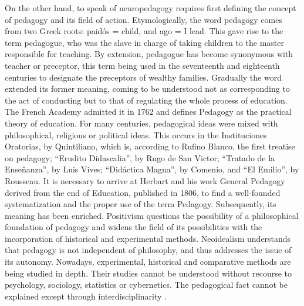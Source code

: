 \documentclass[english]{textolivre}
\begin{document}
On the other hand, to speak of neuropedagogy requires first defining the concept of pedagogy and its field of action. Etymologically, the word pedagogy comes from two Greek roots: paidós = child, and ago = I lead. This gave rise to the term pedagogue, who was the slave in charge of taking children to the master responsible for teaching. By extension, pedagogue has become synonymous with teacher or preceptor, this term being used in the seventeenth and eighteenth centuries to designate the preceptors of wealthy families. Gradually the word extended its former meaning, coming to be understood not as corresponding to the act of conducting but to that of regulating the whole process of education. The French Academy admitted it in 1762 and \textcite{durkheim_jugements_1911} defines Pedagogy as the practical theory of education. For many centuries, pedagogical ideas were mixed with philosophical, religious or political ideas. This occurs in the Instituciones Oratorias, by Quintiliano, which is, according to Rufino Blanco, the first treatise on pedagogy; “Erudito Didascalia”, by Rugo de San Victor; “Tratado de la Enseñanza”, by Luis Vives; “Didáctica Magna”, by Comenio, and “El Emilio”, by Rousseau. It is necessary to arrive at Herbart and his work General Pedagogy derived from the end of Education, published in 1806, to find a well-founded systematization and the proper use of the term Pedagogy. Subsequently, its meaning has been enriched. Positivism questions the possibility of a philosophical foundation of pedagogy and widens the field of its possibilities with the incorporation of historical and experimental methods. Neoidealism understands that pedagogy is not independent of philosophy, and thus addresses the issue of its autonomy. Nowadays, experimental, historical and comparative methods are being studied in depth. Their studies cannot be understood without recourse to psychology, sociology, statistics or cybernetics. The pedagogical fact cannot be explained except through interdisciplinarity \cite[p. 12-18]{rotger_amengual_ciencias_1984}.
\end{document}
